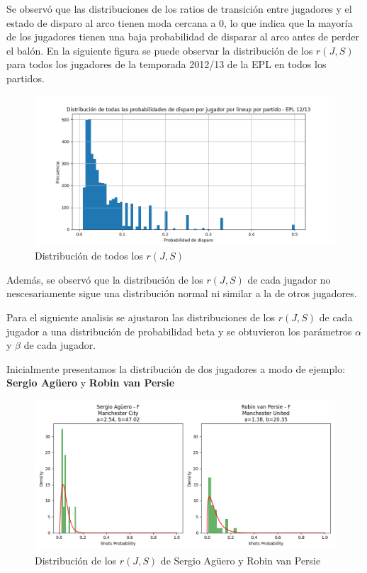 \documentclass[
  a4paper,
]{article}
\begin{document}
Se observó que las distribuciones de los ratios de transición entre
jugadores y el estado de disparo al arco tienen moda cercana a 0, lo que
indica que la mayoría de los jugadores tienen una baja probabilidad de
disparar al arco antes de perder el balón. En la siguiente figura se
puede observar la distribución de los \(r(J, S)\) para todos los
jugadores de la temporada 2012/13 de la EPL en todos los partidos.

\begin{figure}
  \includegraphics{recursos_pdf/graficos/Probabilidad_de_disparo.png}
    \caption{Distribución de todos los $r(J, S)$}
\end{figure}

Además, se observó que la distribución de los \(r(J, S)\) de cada
jugador no nescesariamente sigue una distribución normal ni similar a la
de otros jugadores.

Para el siguiente analisis se ajustaron las distribuciones de los
\(r(J, S)\) de cada jugador a una distribución de probabilidad beta y se
obtuvieron los parámetros \(\alpha\) y \(\beta\) de cada jugador.

Inicialmente presentamos la distribución de dos jugadores a modo de
ejemplo: \textbf{Sergio Agüero} y \textbf{Robin van Persie}

\begin{figure}
  \includegraphics{recursos_pdf/graficos/Sergio_Aguero_Robin_van_Persie_shots_prob_beta_binomial.png}
    \caption{Distribución de los $r(J, S)$ de Sergio Agüero y Robin van Persie}
\end{figure}
\end{document}
